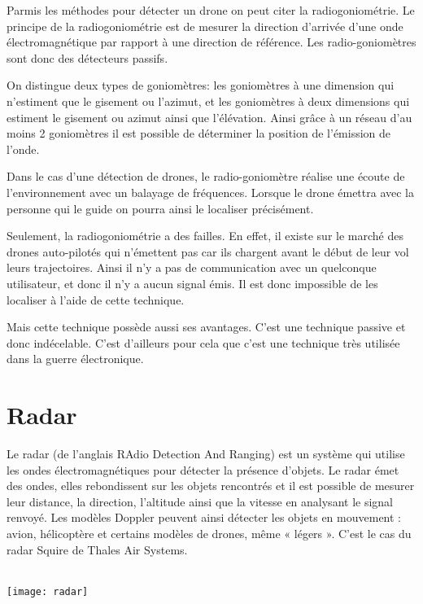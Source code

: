 Parmis les méthodes pour détecter un drone on peut citer la radiogoniométrie. Le principe de la radiogoniométrie est de mesurer la direction d'arrivée d'une onde électromagnétique par rapport à une direction de référence. Les radio-goniomètres sont donc des détecteurs passifs. 

On distingue deux types de goniomètres: les goniomètres à une dimension qui n'estiment que le gisement ou l'azimut, et les goniomètres à deux dimensions qui estiment le gisement ou azimut ainsi que l'élévation. Ainsi grâce à un réseau d'au moins 2 goniomètres il est possible de déterminer la position de l'émission de l'onde.


Dans le cas d'une détection de drones, le radio-goniomètre réalise une écoute de l'environnement avec un balayage de fréquences. Lorsque le drone émettra avec la personne qui le guide on pourra ainsi le localiser précisément.

Seulement, la radiogoniométrie a des failles. En effet, il existe sur le marché des drones auto-pilotés qui n'émettent pas car ils chargent avant le début de leur vol leurs trajectoires. Ainsi il n'y a pas de communication avec un quelconque utilisateur, et donc il n'y a aucun signal émis. Il est donc impossible de les localiser à l'aide de cette technique.

Mais cette technique possède aussi ses avantages. C'est une technique passive et donc indécelable. C'est d'ailleurs pour cela que c'est une technique très utilisée dans la guerre électronique. 



\section{Radar}
Le radar (de l'anglais RAdio Detection And Ranging) est un système qui utilise les ondes électromagnétiques pour détecter la présence d'objets. Le radar émet des ondes, elles rebondissent sur les objets rencontrés et il est possible de mesurer leur distance, la direction, l'altitude ainsi que la vitesse en analysant le signal renvoyé. Les modèles Doppler peuvent ainsi détecter les objets en mouvement : avion, hélicoptère et certains modèles de drones, même « légers ». C'est le cas du radar Squire de Thales Air Systems. 

~\\

\texttt{[image: radar]}

